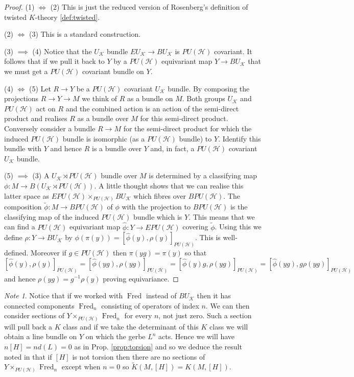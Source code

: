 \documentclass[a4paper,reqno]{amsart}
\DeclareMathOperator{\Fred}{Fred}
\theoremstyle{plain}
\theoremstyle{definition}
\theoremstyle{remark}
\newtheorem{note}{Note}[section]
\numberwithin{equation}{section}
\numberwithin{figure}{section}
\newcommand{\cH}{{\mathcal H}}
\newcommand{\redK}{\widetilde K} %
\newcommand{\UK}{U{_\mathcal K}}
\newcommand{\<}{\langle}
\renewcommand{\>}{\rangle}
\begin{document}
\begin{proof}
(1) $\iff$ (2) This is just the reduced version of Rosenberg's
definition of twisted $K$-theory \ref{def:twisted}.

(2) $\iff$ (3) This is a standard construction.

(3) $ \implies$ (4) Notice that the $\UK$ bundle $E\UK \to B\UK$ is $PU(\cH)$
covariant. It follows that if we pull it back to $Y$ by a $PU(\cH)$
equivariant map $Y \to B\UK$ that we must get a
$PU(\cH)$ covariant bundle on $Y$.

(4) $ \iff$ (5) Let $R \to Y$ be a $PU(\cH) $ covariant $\UK$ bundle.
By composing the projections $R \to Y \to M$ we think of $R$ as a
bundle on $M$. Both groups $\UK$ and $PU(\cH)$ act on $R$ and the
combined action is an action of the semi-direct product and realises
$R$ as a bundle over $M$ for this semi-direct product.  Conversely
consider a bundle $R \to M$ for the semi-direct product for which the
induced $PU(\cH)$ bundle is isomorphic (as a $PU(\cH)$ bundle) to $Y$.
Identify this bundle with $Y$ and hence $R$ is a bundle over $Y$ and,
in fact, a $PU(\cH)$ covariant $\UK$ bundle.

(5) $ \implies$ (3) A $\UK \rtimes PU(\cH)$ bundle over $M$ is
determined by a classifying
map $\phi \colon M \to B(\UK \rtimes PU(\cH))$.  A little thought shows
that we can realise
this latter space as $EPU(\cH) \times_{PU(\cH)} B\UK$ which fibres over
$BPU(\cH)$. The composition
$\tilde\phi \colon M \to BPU(\cH)$ of $\phi$ with the projection to
$BPU(\cH)$ is the
classifying map of the induced $PU(\cH)$ bundle which is $Y$. This
means that we can find
a $PU(\cH)$ equivariant map $\hat\phi \colon Y \to EPU(\cH)$
covering $\tilde\phi$.
Using this we define $\rho \colon Y \to B\UK$ by $\phi(\pi(y)) = [
\hat\phi(y), \rho(y)]_{PU(\cH)}$.
This is well-defined. Moreover if $g \in PU(\cH)$
then $\pi(yg) = \pi(y)$ so that
$ [ \hat\phi(y), \rho(y)]_{PU(\cH)} = [\hat\phi(yg), \rho(yg)]_{PU(\cH)}  =
        [\hat\phi(y)g, \rho(yg)]_{PU(\cH)} = [\hat\phi(yg),
g\rho(yg)]_{PU(\cH)}$ and hence
$\rho(yg) = g^{-1} \rho(y)$ proving equivariance.

\end{proof}

\begin{note} Notice that if we worked with $\Fred$ instead
of $B\UK$ then it has connected components $\Fred_n$ consisting
of operators of index $n$.  We can then consider sections
of $Y \times_{PU(\cH)} \Fred_n$ for every $n$, not just zero.
Such a section will pull back a $K$ class and if we take
the determinant of this $K$ class we will obtain a line bundle
on $Y$ on which the gerbe $L^n$ acts.  Hence we will have
$n [H] = n d(L) = 0$ as in Prop. \ref{prop:torsion} and so
we deduce the result noted in \cite{Ati2} that if $[H] $ is
not torsion then there are no sections of $Y \times_{PU(\cH)} \Fred_n$
except when $n = 0$ so $\redK(M, [H]) = K(M, [H])$.
\end{note}
\end{document}
